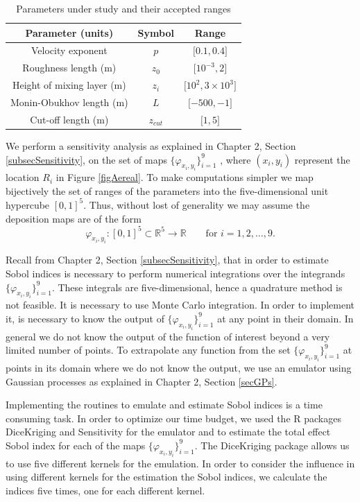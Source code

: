 \documentclass[12pt]{book}
\begin{document}
\begin{table}[H]
\centering
\begin{tabular}{|c|c|c|}
\hline 
Parameter (units) & Symbol & Range\tabularnewline
\hline 
\hline 
Velocity exponent  & $p$ & ${[}0.1,0.4{]}$\tabularnewline
\hline 
Roughness length (m) & $z_{0}$ & ${[}10^{-3} ,2{]}$\tabularnewline
\hline 
Height of mixing layer (m) & $z_{i}$ & ${[}10^{2},3\times 10^{3}{]}$\tabularnewline
\hline 
Monin-Obukhov length (m) & $L$ & ${[}-500,-1{]}$\tabularnewline
\hline 
Cut-off length (m) & $z_{cut}$ & ${[}1,5{]}$\tabularnewline
\hline 
\end{tabular}
\caption{Parameters under study and their accepted ranges}
\label{tabRanges}
\end{table}
We perform a sensitivity analysis as explained in Chapter 2, Section \ref{subsecSensitivity},
on the set of maps $\{\varphi_{x_{i},y_{i}}\}_{i=1}^{9}$ ,
where $(x_{i},y_{i})$ represent the location $R_{i}$ in Figure \ref{figAereal}.
To make computations
simpler we map bijectively the set of ranges of the parameters into the five-dimensional
unit hypercube $[0,1]^{5}$. Thus, without lost of generality we may assume the deposition maps are of the form 
\begin{equation*}
\varphi_{x_{i},y_{i}}:[0,1]^{5}\subset\mathbb{R}^{5}\rightarrow\mathbb{R}\qquad\text{for }i=1,2,\ldots,9.
\end{equation*} 

Recall from  Chapter 2, Section \ref{subsecSensitivity}, that in order to estimate
Sobol indices is necessary to perform numerical integrations over the integrands $\{\varphi_{x_{i},y_{i}}\}_{i=1}^{9}$.
These integrals are five-dimensional, hence a quadrature method is not feasible. It is
necessary to use Monte Carlo integration. In order to implement it, is necessary
to know the output of $\{\varphi_{x_{i},y_{i}}\}_{i=1}^{9}$ at any point in their domain. In general we do not
know the output of the function of interest beyond a very limited number of points. 
To extrapolate any function from the set $\{\varphi_{x_{i},y_{i}}\}_{i=1}^{9}$
at  points in its domain where we do not know the output, we use an emulator using Gaussian processes as
explained in Chapter 2, Section \ref{secGPs}.

Implementing the routines to  emulate  and estimate
 Sobol indices is a time consuming task. In order to optimize our time budget, we used
the R packages DiceKriging and Sensitivity \cite{DiceKriging,sensitivity} for the 
emulator and to  estimate the total
effect Sobol index for each of the maps  $\{\varphi_{x_{i},y_{i}}\}_{i=1}^{9}$.  
The DiceKriging package allows us to use five different kernels for the emulation.
In order to consider the influence in using different kernels for the estimation  the Sobol
indices, we calculate the indices five times, one for each different kernel. 
\end{document}
